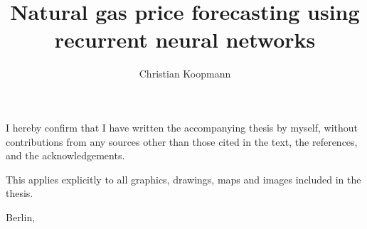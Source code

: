 \documentclass[12pt]{ociamthesis}
\title{\Large{Natural gas price forecasting using recurrent neural networks}}     %
\author{Christian Koopmann}             %
\begin{document}
\maketitle
\begin{romanpages}
\begin{acknowledgements}

\end{acknowledgements}
\tableofcontents
\listoffigures
\listoftables

\end{romanpages}




\begin{originality}
I hereby confirm that I have written the accompanying thesis by myself, without
contributions from any sources other than those cited in the text, the references, and
the acknowledgements.

This applies explicitly to all graphics, drawings, maps and images included in the
thesis.

Berlin, 
\end{originality}
\end{document}
